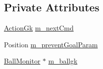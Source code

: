 \subsection*{Private Attributes}
\begin{DoxyCompactItemize}
\item 
\hyperlink{classGoalkeeper_a25db0bed632b4bdb87532b0fbbf45855}{ActionGk} \hyperlink{classGoalkeeper_a84e9e9f514d0ace81c95e03ee832aea8}{m\_\-nextCmd}
\item 
Position \hyperlink{classGoalkeeper_a04b3ca2b51698e36928ccce7569842eb}{m\_\-preventGoalParam}
\item 
\hyperlink{classBallMonitor}{BallMonitor} $\ast$ \hyperlink{classGoalkeeper_a8fc8e75ffc8d3582d293b0fe42a0c073}{m\_\-ballgk}
\end{DoxyCompactItemize}


